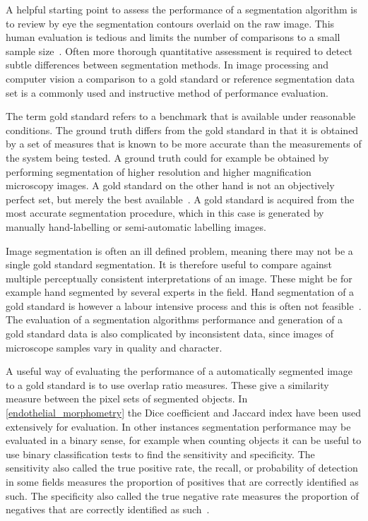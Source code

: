 A helpful starting point to assess the performance of a segmentation algorithm is to review by eye the segmentation contours overlaid on the raw image. This human evaluation is tedious and limits the number of comparisons to a small sample size~\cite{Zhang2008}. Often more thorough quantitative assessment is required to detect subtle differences between segmentation methods. In image processing and computer vision a comparison to a gold standard or reference segmentation data set is a commonly used and instructive method of performance evaluation.

The term gold standard refers to a benchmark that is available under reasonable conditions. The ground truth differs from the gold standard in that it is obtained by a set of measures that is known to be more accurate than the measurements of the system being tested. A ground truth could for example be obtained by performing segmentation of higher resolution and higher magnification microscopy images. A gold standard on the other hand is not an objectively perfect set, but merely the best available~\cite{Cardoso2014}. A gold standard is acquired from the most accurate segmentation procedure, which in this case is generated by manually hand-labelling or semi-automatic labelling images.

Image segmentation is often an ill defined problem, meaning there may not be a single gold standard segmentation. It is therefore useful to compare against multiple perceptually consistent interpretations of an image. These might be for example hand segmented by several experts in the field. Hand segmentation of a gold standard is however a labour intensive process and this is often not feasible~\cite{Unnikrishnan2005}. The evaluation of a segmentation algorithms performance and generation of a gold standard data is also complicated by inconsistent data, since images of microscope samples vary in quality and character.

A useful way of evaluating the performance of a automatically segmented image to a gold standard is to use overlap ratio measures. These give a similarity measure between the pixel sets of segmented objects. In \autoref{endothelial_morphometry} the Dice coefficient and Jaccard index have been used extensively for evaluation. In other instances segmentation performance may be evaluated in a binary sense, for example when counting objects it can be useful to use binary classification tests to find the sensitivity and specificity. The sensitivity also called the true positive rate, the recall, or probability of detection in some fields measures the proportion of positives that are correctly identified as such. The specificity also called the true negative rate measures the proportion of negatives that are correctly identified as such~\cite{Parikh2008}.

